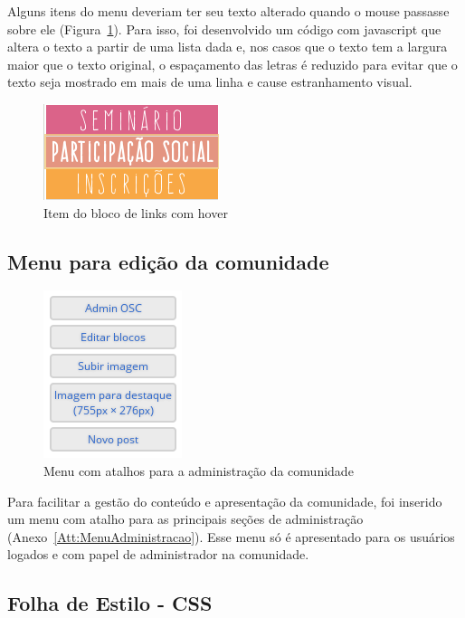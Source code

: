 \documentclass[[a4paper,11pt]{article}
\begin{document}
Alguns itens do menu deveriam ter seu texto alterado quando 
o mouse passasse sobre ele (Figura~\ref{fig:bloco-links-hover}). Para isso, foi desenvolvido um código com javascript
que altera o texto a partir de uma lista dada e, nos casos que o texto tem a
largura maior que o texto original, o espaçamento das letras é reduzido para
evitar que o texto seja mostrado em mais de uma linha e cause estranhamento
visual.

\begin{figure}[h]
\center
\includegraphics[scale=0.4]{bloco-links-hover.png}
\caption{Item do bloco de links com hover}
\label{fig:bloco-links-hover}
\end{figure}

\subsection{Menu para edição da comunidade}

\begin{figure}[h]
\center
\includegraphics[scale=0.5]{menu-rapido.png}
\caption{Menu com atalhos para a administração da comunidade}
\label{fig:menu-rapido}
\end{figure}

Para facilitar a gestão do conteúdo e apresentação da comunidade, foi inserido
um menu com atalho para as principais seções de administração
(Anexo~\ref{Att:MenuAdministracao}). Esse menu só é
apresentado para os usuários logados e com papel de administrador na comunidade.

\subsection{Folha de Estilo - CSS}
\end{document}
